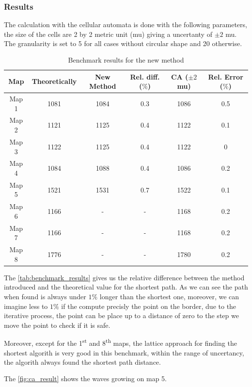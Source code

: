 \documentclass[../main.tex]{subfiles}
\begin{document}
\subsubsection{Results}

The calculation with the cellular automata is done with the following parameters, the size of the cells are 2 by 2 metric unit (mu) giving a uncertanty of $\pm 2$ mu. The granularity is set to 5 for all cases without circular shape and 20 otherwise.

\begin{table}[H]
	\centering
	\begin{tabular}{c c c c c c}
		\hline
		Map & Theoretically & New Method & Rel. diff. ($\%$) & CA ($\pm 2$ mu) & Rel. Error ($\%$)\\
		\hline
		Map 1 & 1081 & 1084 & 0.3 & 1086 & 0.5\\
		Map 2 & 1121 & 1125 & 0.4 & 1122 & 0.1\\
		Map 3 & 1122 & 1125 & 0.4 & 1122 & 0\\
		Map 4 & 1084 & 1088 & 0.4 & 1086 & 0.2\\
		Map 5 & 1521 & 1531 & 0.7 & 1522 & 0.1\\
		Map 6 & 1166 & - & - & 1168 & 0.2\\
		Map 7 & 1166 & - & - & 1168 & 0.2\\
		Map 8 & 1776 & - & - & 1780 & 0.2\\
		\hline
	\end{tabular}
	\caption{Benchmark results for the new method}
	\label{tab:benchmark_results}
\end{table}

The \autoref{tab:benchmark_results} gives us the relative difference between the method introduced and the theoretical value for the shortest path. As we can see the path when found is always under $1\%$ longer than the shortest one, moreover, we can imagine less to $1\%$ if the compute precisly the point on the border, due to the iterative process, the point can be place up to a distance of zero to the step we move the point to check if it is safe.

\vspace{1em}
Moreover, except for the 1\textsuperscript{st} and 8\textsuperscript{th} maps, the lattice approach for finding the shortest algorith is very good in this benchmark, within the range of uncertancy, the algorith always found the shortest path distance.

\vspace{1em}
The \autoref{fig:ca_result} shows the waves growing on map 5.
\end{document}
